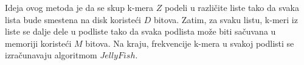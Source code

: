 \documentclass[12pt,oneside]{memoir}
\begin{document}
Ideja ovog metoda je da se skup k-mera $Z$ podeli u različite liste tako da svaka lista bude smestena na disk koristeći $D$ bitova. Zatim, za svaku listu, k-meri iz liste se dalje dele u podliste tako da svaka podlista može biti sačuvana u memoriji koristeći $M$ bitova. Na kraju, frekvencije k-mera u svakoj podlisti se izračunavaju algoritmom $JellyFish$.

\begin{comment}
Preciznije, k-meri u $Z$ su podeljeni u $n_{list}$ lista približno slične dužine. Kako disk ima $D$ bitova i svaki k-mer može biti reprezentovan u 2k bitova, svaka lista može čuvati $l_{list} =  \frac{D}{2k}$ k-mera. Kako imamo $N$ k-mera u $Z$, postavlja se $n_{list} = \frac{N}{n_{list}} = \frac{2kN}{D}$. Ovo deljenje se obavlja heš funkcijom $h()$ koja ravnomerno mapira sve k-mere u $n_{list}$ lista. Preciznije, za svaki k-mer $z$ iz $Z$, $z$ se dodeljuje i-toj listi, ako je $h(z)$ \textit{mod} $n_{list} = i$. 

Zatim, svaka lista se dalje deli u podliste, pri čemu je svaka dužine $l_sublist$. Svaka podlista će biti obrađena u memoriji pomoću algoritma $JellyFish$, koji zahteva $\frac{l_{sublist}}{0.7}(2k +32)$ bitova. Kako memorija ima $M$ bitova, tako je $l_{sublist} = \frac{0.7M}{(2k + 32)}$.

Broj podlista je jednak $n_{sublist} = \frac{n_{list}}{n_{sublist}} = \frac{D(2k + 32)}{0.7(2k)M}$. Slično, svaka lista je podeljena u podliste heš funkcijom $h()$. Preciznije, za svaki k-mer $s$ u i-toj listi, $s$ je dodeljeno j-toj podlisti, ako je $(\frac{h(s)}{n_{list}})$ \textit{mod}
$n_{sublist} = j$.

Za svaku podlistu dužine $l_{sublist} = {0.7M}{2k + 32}$, koristeći $M$ bitova,  brojimo pojavljivanja svakog k-mera u podlisti koristeći $JellyFish(d_j, 0.7, h)$ sa slike \ref{fig:6}.

Na slici \ref{fig:5}(c) se može videti primer koji ilustruje izvršavanje algoritma DSK. Neka je $n_{list} = 2$, $n_{sublist} = 2$ and $h(z) = b(z)$ za svaki $z \in Z$. Kako je $n_{list} = 2$, algoritam izvršava 2 iteracije (u nastavku sledi opis nulte iteracije, jer se prva izvršava slično). Prva faza nulte iteracije skenira sve k-mere iz $Z$ i identifikuje svaki k-mer $z \in Z$ koji pripada nultoj listi. Na primer, $h(GG) = 10$, kako je $h(GG)$ \textit{mod} $n_{list} = 0$ i $\frac{h(z)}{n_{list}}$ \textit{mod} $n_{sublist} = 1$, $GG$ pripada nultoj listi i prvoj podlisti. Nakon toga, nulta lista se deli na nultu podlistu $\{CA\}$ i prvu podlistu $\{CG, GG\}$. Obe podliste su zapisane na disku. Druga faza čita svaku podlistu iz memorije i broji k-mere koristeći $JellyFish$ algoritam.

\end{comment}
\end{document}

